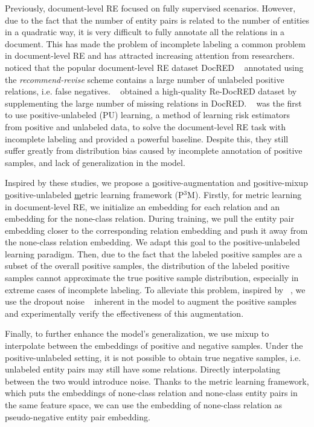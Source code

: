\documentclass[letterpaper]{article}
\begin{document}
Previously, document-level RE focused on fully supervised scenarios. However, due to the fact that the number of entity pairs is related to the number of entities in a quadratic way, it is very difficult to fully annotate all the relations in a document. This has made the problem of incomplete labeling a common problem in document-level RE and has attracted increasing attention from researchers. ~\cite{DBLP:conf/acl/HuangH0ZF022} noticed that the popular document-level RE dataset DocRED ~\cite{DBLP:conf/acl/YaoYLHLLLHZS19} annotated using the \emph{recommend-revise} scheme contains a large number of unlabeled positive relations, i.e. false negatives. ~\cite{DBLP:conf/emnlp/Tan0BNA22} obtained a high-quality Re-DocRED dataset by supplementing the large number of missing relations in DocRED. ~\cite{DBLP:conf/emnlp/WangLHZ22} was the first to use positive-unlabeled (PU) learning, a method of learning risk estimators from positive and unlabeled data, to solve the document-level RE task with incomplete labeling and provided a powerful baseline. Despite this, they still suffer greatly from distribution bias caused by incomplete annotation of positive samples, and lack of generalization in the model.

Inspired by these studies, we propose a \underline{p}ositive-augmentation and \underline{p}ositive-mixup \underline{p}ositive-unlabeled \underline{m}etric learning framework (P$^{3}$M). Firstly, for metric learning in document-level RE, we initialize an embedding for each relation and an embedding for the none-class relation. During training, we pull the entity pair embedding closer to the corresponding relation embedding and push it away from the none-class relation embedding. We adapt this goal to the positive-unlabeled learning paradigm. Then, due to the fact that the labeled positive samples are a subset of the overall positive samples, the distribution of the labeled positive samples cannot approximate the true positive sample distribution, especially in extreme cases of incomplete labeling. To alleviate this problem, inspired by ~\cite{DBLP:conf/emnlp/GaoYC21}, we use the dropout noise ~\cite{DBLP:journals/jmlr/SrivastavaHKSS14} inherent in the model to augment the positive samples and experimentally verify the effectiveness of this augmentation.

Finally, to further enhance the model's generalization, we use mixup to interpolate between the embeddings of positive and negative samples. Under the positive-unlabeled setting, it is not possible to obtain true negative samples, i.e. unlabeled entity pairs may still have some relations. Directly interpolating between the two would introduce noise. Thanks to the metric learning framework, which puts the embeddings of none-class relation and none-class entity pairs in the same feature space, we can use the embedding of none-class relation as pseudo-negative entity pair embedding.
\end{document}

